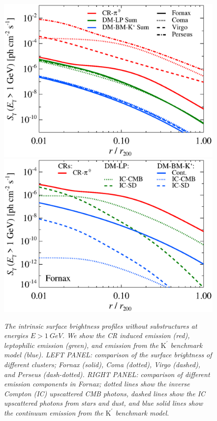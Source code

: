 \documentclass[10pt,aps,pra,reprint,amsmath,amsfonts,amssymb,showpacs,nofootinbib,floatfix]{revtex4-1}
\newcommand{\rmn}{\mathrm}
\newcommand{\Kp}{\rmn{K}^\prime}
\begin{document}
\begin{figure}
\begin{minipage}{2.0\columnwidth}
  \includegraphics[width=0.49\columnwidth]{figures/SB.v14.1GeV.SF700.noSuB.elmu.eps}
  \includegraphics[width=0.49\columnwidth]{figures/SB.fornax.v14.1GeV.SF700.noSuB.elmu.eps}
  \caption{\it The intrinsic surface brightness profiles without
    substructures at energies $E>1\ GeV$. We show the CR induced
    emission (red), leptophilic emission (green), and emission from
    the $\Kp$ benchmark model (blue). LEFT PANEL: comparison of the surface
    brightness of different clusters; Fornax (solid), Coma (dotted),
    Virgo (dashed), and Perseus (dash-dotted). RIGHT PANEL: comparison of
    different emission components in Fornax; dotted lines show the
    inverse Compton (IC) upscattered CMB photons, dashed lines show
    the IC upscattered photons from stars and dust, and blue solid
    lines show the continuum emission from the $\Kp$ benchmark model.}
 \label{fig:SB_clu_nosub}
\end{minipage}
\end{figure}
\end{document}
